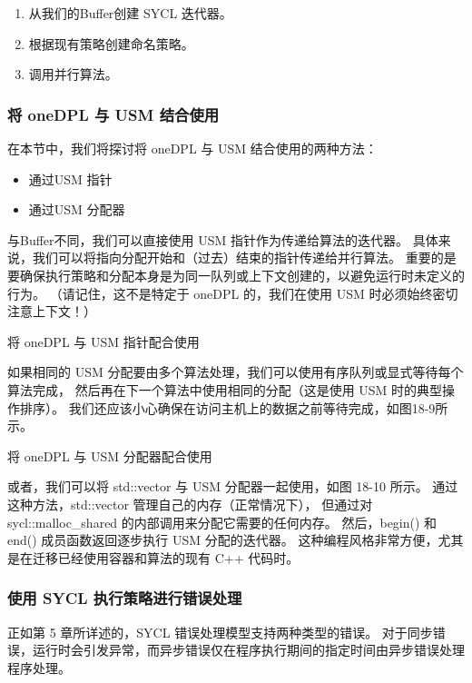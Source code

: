 \begin{enumerate}
	\item 从我们的Buffer创建 SYCL 迭代器。

	\item 根据现有策略创建命名策略。

	\item 调用并行算法。
\end{enumerate}

\subsubsection{将 oneDPL 与 USM 结合使用}
在本节中，我们将探讨将 oneDPL 与 USM 结合使用的两种方法：

\begin{itemize}
	\item 通过USM 指针

	\item 通过USM 分配器
\end{itemize}

与Buffer不同，我们可以直接使用 USM 指针作为传递给算法的迭代器。 
具体来说，我们可以将指向分配开始和（过去）结束的指针传递给并行算法。 
重要的是要确保执行策略和分配本身是为同一队列或上下文创建的，以避免运行时未定义的行为。 
（请记住，这不是特定于 oneDPL 的，我们在使用 USM 时必须始终密切注意上下文！）

{\color{red} 将 oneDPL 与 USM 指针配合使用}

如果相同的 USM 分配要由多个算法处理，我们可以使用有序队列或显式等待每个算法完成，
然后再在下一个算法中使用相同的分配（这是使用 USM 时的典型操作排序）。 
我们还应该小心确保在访问主机上的数据之前等待完成，如图18-9所示。

{\color{red} 将 oneDPL 与 USM 分配器配合使用}

或者，我们可以将 std::vector 与 USM 分配器一起使用，如图 18-10 所示。 
通过这种方法，std::vector 管理自己的内存（正常情况下），
但通过对 sycl::malloc\_shared 的内部调用来分配它需要的任何内存。 
然后，begin() 和 end() 成员函数返回逐步执行 USM 分配的迭代器。 
这种编程风格非常方便，尤其是在迁移已经使用容器和算法的现有 C++ 代码时。

\subsubsection{使用 SYCL 执行策略进行错误处理}
正如第 5 章所详述的，SYCL 错误处理模型支持两种类型的错误。 
对于同步错误，运行时会引发异常，而异步错误仅在程序执行期间的指定时间由异步错误处理程序处理。

